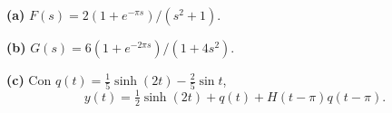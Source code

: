 \noindent\textbf{(a)} $F(s)=2(1+e^{-\pi s})/(s^2+1)$.

\noindent\textbf{(b)} $G(s)=6(1+e^{-2\pi s})/(1+4s^2)$.

\noindent\textbf{(c)} Con $q(t)=\tfrac15\sinh(2t)-\tfrac25\sin t$,
\[y(t)=\tfrac12\sinh(2t)+q(t)+H(t-\pi)q(t-\pi).\]
